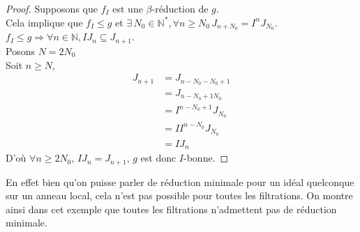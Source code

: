 \begin{proof}
	Supposons que $f_I$ est une $\beta$-réduction de $g$.\\
	Cela implique que $f_I \leq g$ et $\exists \, N_0 \in \mathbb{N^*} , \forall n \geq N_0 \, J_{n+N_0} = I^n J_{N_0}$.\\
	$f_I \leq g \Rightarrow \forall n \in \mathbb{N} , IJ_n \subseteq J_{n+1}$.\\
	Posons $N = 2N_0$\\
	Soit $n \geq N$, 
	\begin{align*}
		J_{n+1} &= J_{n-N_0-N_0+1}\\
		&= J_{n-N_0+1N_0}\\
		&= I^{n-N_0+1} J_{N_0}\\
		&= II^{n-N_0} J_{N_0}\\
		&= IJ_n
	\end{align*}
	D'où $\forall n \geq 2N_0$, $IJ_n = J_{n+1}$, $g$ est donc $I$-bonne. 
\end{proof}
\begin{maremarque}
	En effet bien qu'on puisse parler de réduction minimale pour un idéal quelconque sur un anneau local, cela n'est pas possible pour toutes les filtrations. On montre ainsi dans cet exemple que toutes les filtrations n'admettent pas de réduction minimale.
\end{maremarque}
